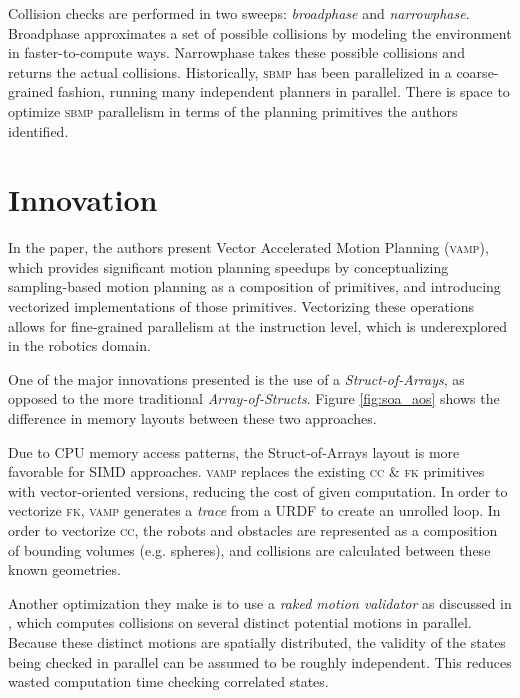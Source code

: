 \documentclass{article}
\newcommand{\todo}[1]{\textbf{\color{red}#1}}
\begin{document}
Collision checks are performed in two sweeps: \textit{broadphase} and \textit{narrowphase}. Broadphase approximates a set of possible collisions by modeling the environment in faster-to-compute ways. Narrowphase takes these possible collisions and returns the actual collisions.
Historically, \textsc{sbmp} has been parallelized in a coarse-grained fashion, running many independent planners in parallel. There is space to optimize \textsc{sbmp} parallelism in terms of the planning primitives the authors identified. 

\section{Innovation}

In the paper, the authors present Vector Accelerated Motion Planning (\textsc{vamp}), which provides significant motion planning speedups by conceptualizing sampling-based motion planning as a composition of primitives, and introducing vectorized implementations of those primitives. Vectorizing these operations allows for fine-grained parallelism at the instruction level, which is underexplored in the robotics domain.

One of the major innovations presented is the use of a \textit{Struct-of-Arrays}, as opposed to the more traditional \textit{Array-of-Structs}. Figure \ref{fig:soa_aos} shows the difference in memory layouts between these two approaches.


Due to CPU memory access patterns, the Struct-of-Arrays layout is more favorable for SIMD approaches. \textsc{vamp} replaces the existing \textsc{cc} \& \textsc{fk} primitives with vector-oriented versions, reducing the cost of given computation. 
In order to vectorize \textsc{fk}, \textsc{vamp} generates a \textit{trace} from a URDF to create an unrolled loop. 
In order to vectorize \textsc{cc}, the robots and obstacles are represented as a composition of bounding volumes (e.g. spheres), and collisions are calculated between these known geometries.

Another optimization they make is to use a \textit{raked motion validator} as discussed in \cite{paper:eemp}, which computes collisions on several distinct potential motions in parallel. Because these distinct motions are spatially distributed, the validity of the states being checked in parallel can be assumed to be roughly independent. This reduces wasted computation time checking correlated states.

\end{document}
